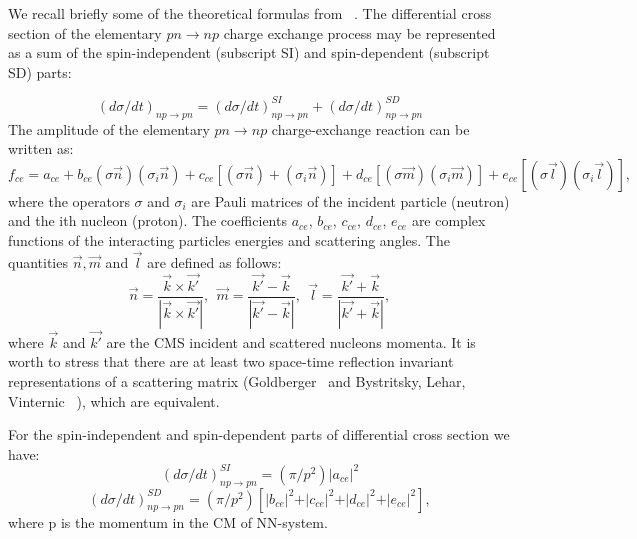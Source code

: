 \documentclass[a4paper,12pt]{article}
\begin{document}
We recall briefly some of the theoretical formulas from ~\cite{a8,a9}. The
differential cross section of the elementary $pn \to np$ charge exchange process
may be represented as a sum of the spin-independent (subscript SI) and
spin-dependent (subscript SD) parts:

\begin{displaymath}
  (d\sigma/dt)_{np\rightarrow pn}=(d \sigma /dt)^{SI}_{np\rightarrow
    pn} + (d \sigma /dt)^{SD}_{np\rightarrow pn}
\end{displaymath}
The amplitude of the elementary $pn \to np$ charge-exchange reaction can be
written as:
\begin{displaymath}
  f_{ce}=a_{ce}+b_{ce} (\sigma \vec{n})( \sigma _{i}\vec{n})
  +c_{ce}[(\sigma \vec{n})+( \sigma _{i} \vec{n})]+d_{ce} [(\sigma
    \vec{m})( \sigma _{i}\vec{m})]+e_{ce} [(\sigma \vec{l})( \sigma
    _{i}\vec{l})],
\end{displaymath}
where the operators $\sigma$ and $\sigma_i$ are Pauli matrices of the incident
particle (neutron) and the ith nucleon (proton). The coefficients
$a_{ce}$, $b_{ce}$, $c_{ce}$, $d_{ce}$, $e_{ce}$ are complex functions of the
interacting particles energies and scattering angles. The quantities
$ \vec{n}, \vec {m} $ and $\vec{l} $ are defined as follows:
\begin{displaymath}
  \vec{n}=\frac{\vec{k}\times\vec{k'}}{|\vec{k}\times\vec{k'}|},~~
  \vec {m}=\frac{\vec{k'}-\vec{k}}{|\vec{k'}-\vec{k}|},~~
  \vec{l}=\frac{\vec{k'}+\vec{k}}{|\vec{k'}+\vec{k}|},
\end{displaymath}
where $ \vec{k}$  and $\vec{k'}$  are the  CMS incident and scattered nucleons
momenta. It is worth to stress that there are at least two space-time reflection
invariant representations of a scattering matrix (Goldberger~\cite{a10} and
Bystritsky, Lehar, Vinternic~ \cite{a11}), which are equivalent.

For the spin-independent and spin-dependent parts of differential cross section
we have:
\begin{displaymath}
  (d \sigma /dt)^{SI}_{np\rightarrow pn} = (\pi /p^{2}){\vert
  }a_{ce}{\vert }^{2}
\end{displaymath}
\begin{displaymath}
  (d \sigma /dt)^{SD}_{np\rightarrow pn} =(\pi/p^{2})[ \vert b_{ce}
    \vert ^{2}+ \vert c_{ce} \vert ^{2}+ \vert d_{ce} \vert ^{2}+ \vert
    e_{ce} \vert ^{2}],
\end{displaymath}
where p  is the momentum in the CM of NN-system.
\end{document}
